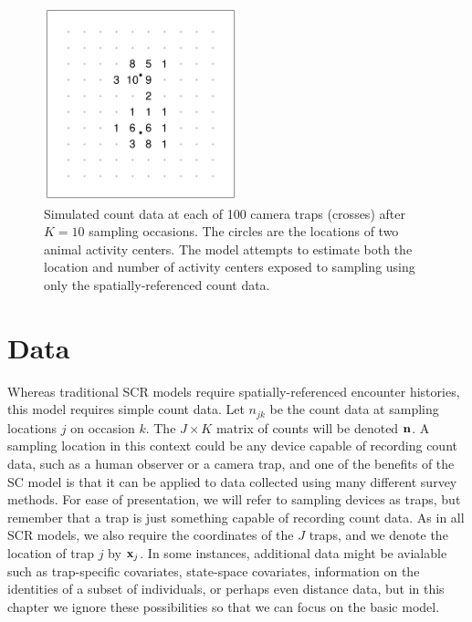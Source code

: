 \begin{figure}%
\centering
\includegraphics[width=0.5\textwidth]{Ch18-Unmarked/figs/heuristic}
\caption{Simulated count data at each of 100 camera traps
  (crosses) after $K=10$ sampling occasions. The circles are the
  locations of two animal activity centers. The
  \citet{chandler_royle:2012} model attempts to
  estimate both the location and number of activity centers exposed to
  sampling using only the spatially-referenced count data.}
\label{chapt-unmarked.fig.heur}
\end{figure}





\section{Data}

Whereas traditional SCR models require spatially-referenced
encounter histories, this model requires simple count data.
Let $n_{jk}$ be the count data at sampling locations $j$ %
on occasion $k$. %
The $J \times K$ matrix of
counts will be denoted $\bf{n}$. A sampling location in this context
could be any device capable of recording count data, such as a
human observer or a camera trap, and
one of the benefits of the SC model is that it
can be applied to data collected using many different survey
methods. For ease of presentation, we will refer to sampling devices
as traps, but remember that a trap is just something capable of
recording count data. As in all SCR models, we also require the
coordinates of the $J$ traps, and we denote the location of trap $j$
by ${\bf x}_j$. In some instances, additional data might be avialable such as
trap-specific covariates, state-space covariates,
information on the identities of a subset of individuals, or perhaps
even distance data, but in this chapter we ignore these %
possibilities so that we can focus on the basic model.

